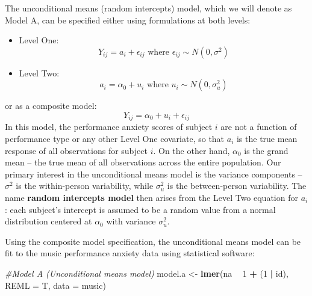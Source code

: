 \documentclass[
]{krantz}
\newenvironment{Shaded}{\begin{snugshade}}{\end{snugshade}}
\newcommand{\CommentTok}[1]{\textcolor[rgb]{0.37,0.37,0.37}{\textit{#1}}}
\newcommand{\DataTypeTok}[1]{\textcolor[rgb]{0.27,0.27,0.27}{#1}}
\newcommand{\DecValTok}[1]{\textcolor[rgb]{0.06,0.06,0.06}{#1}}
\newcommand{\KeywordTok}[1]{\textcolor[rgb]{0.27,0.27,0.27}{\textbf{#1}}}
\newcommand{\NormalTok}[1]{#1}
\newcommand{\OperatorTok}[1]{\textcolor[rgb]{0.43,0.43,0.43}{\textbf{#1}}}
\newcommand{\StringTok}[1]{\textcolor[rgb]{0.5,0.5,0.5}{#1}}
\providecommand{\tightlist}{%
  \setlength{\itemsep}{0pt}\setlength{\parskip}{0pt}}
\begin{document}
The unconditional means (random intercepts) model, which we will denote as Model A, can be specified either using formulations at both levels:

\begin{itemize}
\tightlist
\item
  Level One:
  \begin{equation*}
  Y_{ij} = a_{i}+\epsilon_{ij} \textrm{ where } \epsilon_{ij}\sim N(0,\sigma^2)
  \end{equation*}
\item
  Level Two:
  \begin{equation*}
  a_{i} = \alpha_{0}+u_{i} \textrm{ where } u_{i}\sim N(0,\sigma_{u}^{2})
  \end{equation*}
\end{itemize}

or as a composite model:
\begin{equation*}
Y_{ij}=\alpha_{0}+u_{i}+\epsilon_{ij}
\end{equation*}
In this model, the performance anxiety scores of subject \(i\) are not a function of performance type or any other Level One covariate, so that \(a_{i}\) is the true mean response of all observations for subject \(i\). On the other hand, \(\alpha_{0}\) is the grand mean -- the true mean of all observations across the entire population. Our primary interest in the unconditional means model is the variance components -- \(\sigma^2\) is the within-person variability, while \(\sigma_{u}^{2}\) is the between-person variability. The name \textbf{random intercepts model} then arises from the Level Two equation for \(a_{i}\): each subject's intercept is assumed to be a random value from a normal distribution centered at \(\alpha_{0}\) with variance \(\sigma_{u}^{2}\).

Using the composite model specification, the unconditional means model can be fit to the music performance anxiety data using statistical software:

\begin{Shaded}
\begin{Highlighting}[]
\CommentTok{#Model A (Unconditional means model)}
\NormalTok{model.a <-}\StringTok{ }\KeywordTok{lmer}\NormalTok{(na }\OperatorTok{~}\StringTok{ }\DecValTok{1} \OperatorTok{+}\StringTok{ }\NormalTok{(}\DecValTok{1} \OperatorTok{|}\StringTok{ }\NormalTok{id), }\DataTypeTok{REML =}\NormalTok{ T, }\DataTypeTok{data =}\NormalTok{ music)}
\end{Highlighting}
\end{Shaded}
\end{document}
